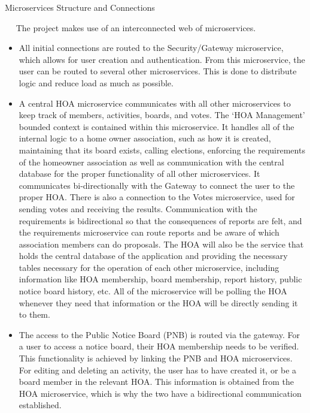 \documentclass{article}
\begin{document}
\begin{section}{Microservices Structure and Connections}

	$\quad$ The project makes use of an interconnected web of microservices.
    \begin{itemize}
        \item  All initial connections are routed to the Security/Gateway microservice, which allows for user creation and authentication. From this microservice, the user can be routed to several other microservices. This is done to distribute logic and reduce load as much as possible.
        \item A central HOA microservice communicates with all other microservices to keep track of members, activities, boards, and votes. The ‘HOA Management’ bounded context is contained within this microservice. It handles all of the internal logic to a home owner association, such as how it is created, maintaining that its board exists, calling elections, enforcing the requirements of the homeowner association as well as communication with the central database for the proper functionality of all other microservices. It communicates bi-directionally with the Gateway to connect the user to the proper HOA. There is also a connection to the Votes microservice, used for sending votes and receiving the results. Communication with the requirements is bidirectional so that the consequences of reports are felt, and the requirements microservice can route reports and be aware of which association members can do proposals. The HOA will also be the service that holds the central database of the application and providing the necessary tables necessary for the operation of each other microservice, including information like HOA membership, board membership, report history, public notice board history, etc. All of the microservice will be polling the HOA whenever they need that information or the HOA will be directly sending it to them.

	\item The access to the Public Notice Board (PNB) is routed via the gateway. For a user to access a notice board, their HOA membership needs to be verified. This functionality is achieved by linking the PNB and HOA microservices. For editing and deleting an activity, the user has to have created it, or be a board member in the relevant HOA. This information is obtained from the HOA microservice, which is why the two have a bidirectional communication established.


\end{itemize}
\end{section}
\end{document}
